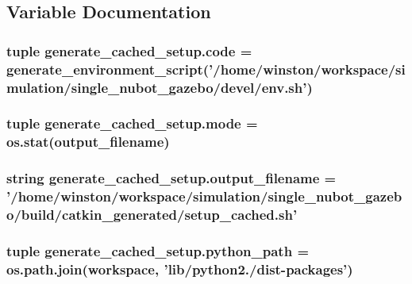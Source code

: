 \subsection{Variable Documentation}
\hypertarget{namespacegenerate__cached__setup_a4ed71aac3acd6cda6640f912559b5408}{
\subsubsection[{code}]{\setlength{\rightskip}{0pt plus 5cm}tuple generate\-\_\-cached\-\_\-setup.\-code = generate\-\_\-environment\-\_\-script('/home/winston/workspace/simulation/single\-\_\-nubot\-\_\-gazebo/devel/env.\-sh')}}\label{namespacegenerate__cached__setup_a4ed71aac3acd6cda6640f912559b5408}
\hypertarget{namespacegenerate__cached__setup_afd1a431f16a2a78ef0438a658e4ac3cf}{
\subsubsection[{mode}]{\setlength{\rightskip}{0pt plus 5cm}tuple generate\-\_\-cached\-\_\-setup.\-mode = os.\-stat({\bf output\-\_\-filename})}}\label{namespacegenerate__cached__setup_afd1a431f16a2a78ef0438a658e4ac3cf}
\hypertarget{namespacegenerate__cached__setup_a0265aee5075ee1eb701ff69c98ad6793}{
\subsubsection[{output\-\_\-filename}]{\setlength{\rightskip}{0pt plus 5cm}string generate\-\_\-cached\-\_\-setup.\-output\-\_\-filename = '/home/winston/workspace/simulation/single\-\_\-nubot\-\_\-gazebo/build/catkin\-\_\-generated/setup\-\_\-cached.\-sh'}}\label{namespacegenerate__cached__setup_a0265aee5075ee1eb701ff69c98ad6793}
\hypertarget{namespacegenerate__cached__setup_a770288702e38f06cf1b86a33bc07723e}{
\subsubsection[{python\-\_\-path}]{\setlength{\rightskip}{0pt plus 5cm}tuple generate\-\_\-cached\-\_\-setup.\-python\-\_\-path = os.\-path.\-join(workspace, 'lib/python2./dist-\/packages')}}\label{namespacegenerate__cached__setup_a770288702e38f06cf1b86a33bc07723e}
